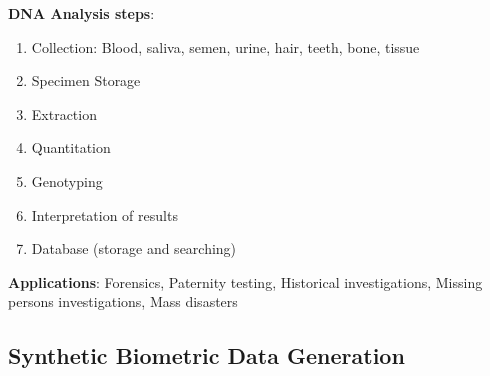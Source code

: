 \documentclass[a4paper]{article}
\begin{document}
      \textbf{DNA Analysis steps}:
      \begin{enumerate}
        \item Collection: Blood, saliva, semen, urine, hair, teeth, bone, tissue
        \item Specimen Storage
        \item Extraction
        \item Quantitation
        \item Genotyping
        \item Interpretation of results
        \item Database (storage and searching)
      \end{enumerate}

      \textbf{Applications}:
        Forensics, Paternity testing, Historical investigations, Missing persons investigations, Mass disasters
  \subsection*{Synthetic Biometric Data Generation}
\end{document}
